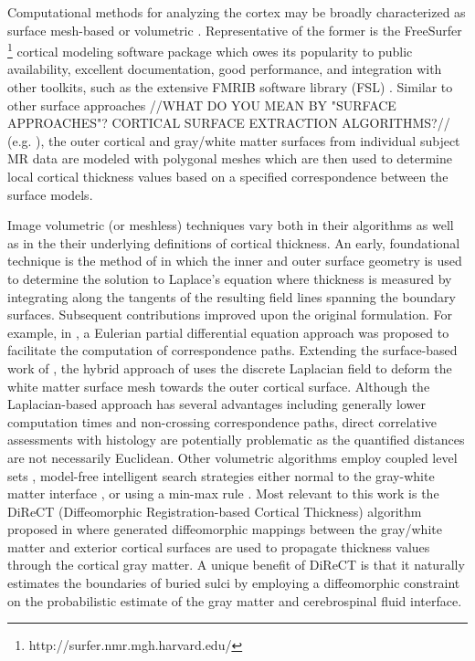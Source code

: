 Computational methods for analyzing the cortex may be 
broadly characterized as surface mesh-based or volumetric \citep{scott2009,clarkson2011}.  Representative of the former is the
FreeSurfer%
\footnote{
http://surfer.nmr.mgh.harvard.edu/
}
cortical modeling software package \citep{dale1999,fischl1999,fischl2000,fischl2002,fischl2004}
which owes its popularity to public availability, excellent documentation, 
good performance, and  integration with other toolkits, such as the extensive FMRIB software 
library (FSL) \citep{smith2004}.  Similar to other surface
approaches //WHAT DO YOU MEAN BY "SURFACE APPROACHES"? CORTICAL SURFACE EXTRACTION ALGORITHMS?// (e.g. \cite{davatzikos1996,magnotta1999,macdonald2000,kim2005}), the outer cortical
and gray/white matter surfaces from individual subject MR data are modeled with polygonal meshes
which are then used to determine local cortical thickness values based on a specified correspondence between 
the surface models.

Image volumetric (or meshless) techniques vary both in their algorithms as well as
in the their underlying definitions of cortical thickness.  An early, foundational technique is the
method of \cite{jones2000} in which the inner and outer surface geometry is used to determine the
solution to Laplace's equation where thickness is measured by integrating along the 
tangents of the resulting field lines spanning the boundary surfaces.  Subsequent contributions
improved upon the original formulation.  For example, in \cite{yezzi2003}, a Eulerian partial differential equation approach
was proposed to facilitate the computation of correspondence paths.  Extending the surface-based
work of \cite{macdonald2000}, the hybrid approach of
\cite{kim2005} uses the discrete Laplacian field to deform the white matter surface mesh towards the 
outer cortical surface.    Although the Laplacian-based approach has several advantages
including generally lower computation times and
non-crossing correspondence paths, direct correlative assessments with histology
are potentially problematic as the quantified distances 
are not necessarily Euclidean.  Other volumetric algorithms employ coupled
level sets \citep{zeng1999}, model-free intelligent search strategies either normal to 
the gray-white matter interface \citep{scott2009}, or using a min-max rule \citep{clement-vachet2011}.
Most relevant to this work is the DiReCT (Diffeomorphic Registration-based 
Cortical Thickness) algorithm proposed in \cite{das2009} where generated
diffeomorphic mappings between the 
gray/white matter and exterior cortical surfaces are used to propagate thickness values
through the cortical gray matter.  A unique benefit of DiReCT is that it
naturally estimates the boundaries of buried sulci by employing a
diffeomorphic constraint on the probabilistic estimate of the gray
matter and cerebrospinal fluid interface.  

